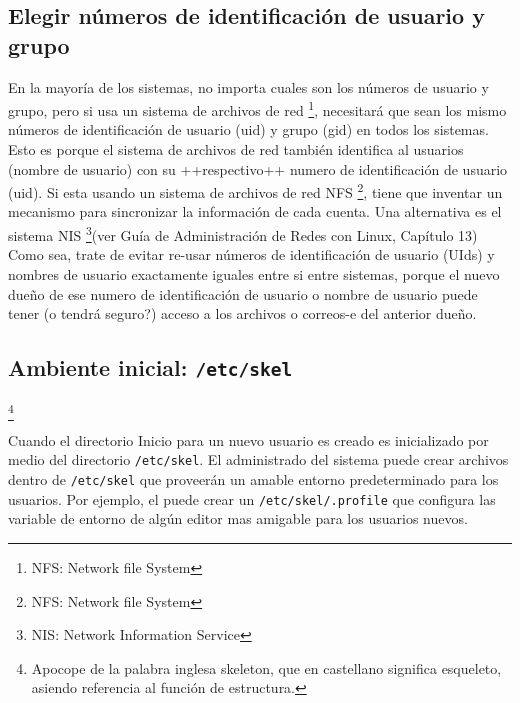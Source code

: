 \documentclass[12pt]{article}
\begin{document}
	
	


\subsection{  Elegir números de identificación de usuario y grupo}

En la mayoría de los sistemas, no importa cuales son los números de
usuario y grupo, pero si usa un sistema de archivos de red 
	\footnote{NFS: Network file System}, necesitará que
sean los mismo números de identificación de usuario (uid) y grupo (gid) en todos
los sistemas. Esto es porque el sistema de archivos de red también identifica al
usuarios (nombre de usuario) con su ++respectivo++ numero de identificación de
usuario (uid).  Si esta usando un sistema de archivos de red NFS
\footnote{NFS: Network file System}, tiene que inventar un mecanismo para sincronizar la información de cada
cuenta. Una alternativa es el sistema NIS
	\footnote{NIS:
	Network Information Service}(ver Guía de Administración de
Redes con Linux, Capítulo 13) Como sea, trate de evitar re-usar
números de identificación de usuario (UIds) y nombres de usuario exactamente
iguales entre si entre sistemas, porque el nuevo dueño de ese numero de
identificación de usuario o nombre de usuario puede tener (o tendrá seguro?)
acceso a los archivos o correos-e del anterior dueño.








\subsection{Ambiente inicial: \texttt{/etc/skel}}
 	\footnote{ Apocope de la palabra inglesa
 	skeleton, que en castellano significa esqueleto, asiendo referencia al función
 de estructura.}

Cuando el directorio Inicio para un nuevo usuario es creado es
inicializado por medio del directorio \texttt{/etc/skel}. El
administrado del sistema puede crear archivos dentro de
\texttt{/etc/skel} que proveerán un amable entorno predeterminado
para los usuarios. Por ejemplo, el puede crear un
\texttt{/etc/skel/.profile} que configura  las variable de entorno
de algún editor mas amigable para los usuarios nuevos.
\end{document}
